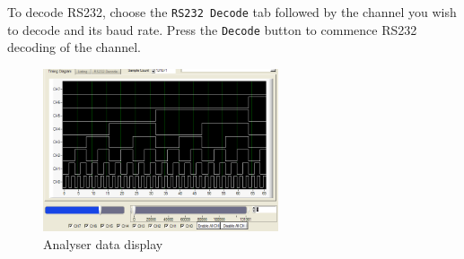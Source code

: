 \documentclass[11pt,twocolumn]{article}
\begin{document}
    To decode RS232, choose the \texttt{RS232 Decode} tab followed by the
    channel you wish to decode and its baud rate. Press the \texttt{Decode}
    button to commence RS232 decoding of the channel.

    \begin{figure}
    \centering
    \includegraphics[height=4.8cm]{ui-timing}
    \caption{Analyser data display}
    \label{fig:ui-timing}
    \end{figure}
	
\end{document}
